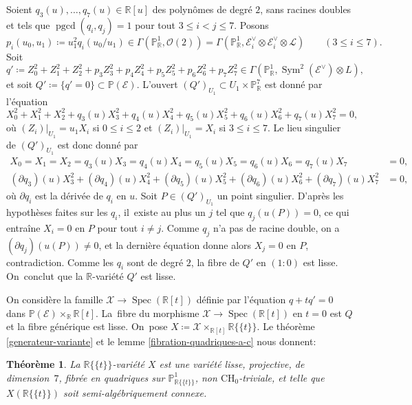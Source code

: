 \documentclass[JEP,XML,SOM,Unicode,francais,published]{cedram}
\newcommand{\CH}{\mathrm{CH}}
\newtheorem{thm}{Théorème}[section]
\theoremstyle{definition}
\newcommand{\R}{\mathbb R}
\renewcommand{\P}{\mathbb P}
\newcommand{\mc}[1]{\mathcal{#1}}
\newcommand{\on}[1]{\operatorname{#1}}
\newcommand{\puiseux}{\mathbb{R}\{\!\{t\}\!\}}
\begin{document}
Soient $q_3(u),\dots,q_7(u)\in \R[u]$ des polynômes de degré $2$, sans racines doubles et tels que $\on{pgcd}(q_i,q_j)=1$ pour tout $3\leq i<j\leq 7$. Posons
\[p_i(u_0,u_1)\coloneqq u_1^2q_i(u_0/u_1)\in \Gamma(\P^1_\R,\mc{O}(2))=\Gamma(\P^1_\R,\mc{E}_i^\vee\otimes \mc{E}_i^\vee\otimes \mc{L})\qquad (3\leq i\leq 7).\]
Soit
\[q'\coloneqq Z_0^2+Z_1^2+Z_2^2+p_3Z_3^2+p_4Z_4^2+p_5Z_5^2+p_6Z_6^2+p_7Z_7^2\in \Gamma(\P^1_\R, \on{Sym}^2(\mc{E}^\vee)\otimes L),\]
et soit $Q'\coloneqq \{q'=0\}\subset \P(\mc{E})$. L'ouvert $(Q')_{U_1}\subset U_1\times \P^7_\R$ est donné par l'équation
\[X_0^2+X_1^2+X_2^2+q_3(u)X_3^2+q_4(u)X_4^2+q_5(u)X_5^2+q_6(u)X_6^2+q_7(u)X_7^2=0,\]
où $(Z_i)|_{U_1}=u_1X_i$ si $0\leq i\leq 2$ et $(Z_i)|_{U_1}=X_i$ si $3\leq i\leq 7$.
Le lieu singulier de $(Q')_{U_1}$ est donc donné par
\begin{align*}
X_0=X_1=X_2=q_3(u)X_3=q_4(u)X_4=q_5(u)X_5=q_6(u)X_6=q_7(u)X_7&=0,\\
(\partial q_3)(u)X_3^2+(\partial q_4)(u)X_4^2+(\partial q_5)(u)X_5^2+(\partial q_6)(u)X_6^2+(\partial q_7)(u)X_7^2&=0,
\end{align*}
où $\partial q_i$ est la dérivée de $q_i$ en $u$. Soit $P\in (Q')_{U_1}$ un point singulier. D'après les hypothèses faites sur les $q_i$, il~existe au plus un $j$ tel que $q_j(u(P))=0$, ce qui entraîne $X_i=0$ en $P$ pour tout $i\neq j$. Comme $q_j$ n'a pas de racine double, on a $(\partial q_j)(u(P))\neq 0$, et la dernière équation donne alors $X_j=0$ en $P$, contradiction. Comme les $q_i$ sont de degré $2$, la fibre de $Q'$ en $(1:0)$ est lisse. On~conclut que la $\R$-variété $Q'$ est lisse.

On considère la famille $\mc{X}\to \on{Spec}(\R[t])$ définie par l'équation $q+tq'=0$ dans $\P(\mc{E})\times_\R\R[t]$. La~fibre du morphisme $\mc{X}\to \on{Spec}(\R[t])$ en $t=0$ est $Q$ et la fibre générique est lisse. On~pose $X\coloneqq \mc{X}\times_{\R[t]}\puiseux$. Le théorème \ref{generateur-variante} et le lemme \ref{fibration-quadriques-a-c} nous donnent:

\begin{thm}\label{fibres-quadriques-6}
La $\puiseux$-variété $X$ est une variété lisse, projective, de dimension~$7$, fibrée en quadriques sur $\P^1_{\puiseux}$, non $\CH_0$-triviale, et telle que $X(\puiseux)$ soit semi-algébriquement connexe.
\end{thm}
\end{document}
